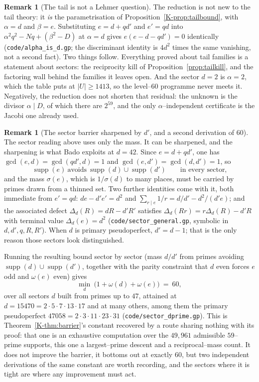 \documentclass[11pt]{article}
\theoremstyle{definition}
\newtheorem{remark}[theorem]{Remark}
\begin{document}
\begin{remark}[The tail is not a Lehmer question]
The reduction is not new to the tail theory: it \emph{is} the parametrisation of
Proposition~\ref{K-prop:tailbound}, with $\alpha=d$ and $\beta=e$. Substituting $e=d+qd'$ and $e'=qd$
into $\alpha^2q^2-Nq+(\beta^2-D)$ at $\alpha=d$ gives $e(e-d-qd')=0$ identically
\textup{(\texttt{code/alpha\_is\_d.gp}; the discriminant identity is $4d^2$ times the same
vanishing, not a second fact)}. Two things follow. Everything proved about tail families is
a statement about sectors: the reciprocity kill of Proposition~\ref{prop:tailkill}, and the
factoring wall behind the families it leaves open. And the sector $d=2$ is $\alpha=2$, which the
table puts at $|U|\ge1413$, so the level--$60$ programme never meets it. Negatively, the reduction
does not shorten that residual: the unknown is the divisor $\alpha\mid D$, of which there are
$2^{59}$, and the only $\alpha$--independent certificate is the Jacobi one already used.


\begin{remark}[The sector barrier sharpened by $d'$, and a second derivation of $60$]\label{rem:sectordprime}
The sector reading above uses only the mass. It can be sharpened, and the sharpening is what
Bado \cite{Bado2026b} exploits at $d=42$. Since $e=d+qd'$, one has $\gcd(e,d)=\gcd(qd',d)=1$ and
$\gcd(e,d')=\gcd(d,d')=1$, so
\[ \operatorname{supp}(e)\ \text{avoids}\ \operatorname{supp}(d)\cup\operatorname{supp}(d')
   \qquad\text{in every sector,} \]
and the mass $\sigma(e)$, which is $1/\sigma(d)$ to many places, must be carried by primes drawn
from a thinned set. Two further identities come with it, both immediate from $e'=qd$:
$de-d'e'=d^2$ and $\sum_{r\mid e}1/r=d/d'-d^2/(d'e)$; and the associated defect
$\Delta_d(R)=dR-d'R'$ satisfies $\Delta_d(Rr)=r\Delta_d(R)-d'R$ with terminal value
$\Delta_d(e)=d^2$ \textup{(\texttt{code/sector\_general.gp}, symbolic in $d,d',q,R,R'$)}. When $d$
is primary pseudoperfect, $d'=d-1$; that is the only reason those sectors look distinguished.

Running the resulting bound sector by sector (mass $d/d'$ from primes avoiding
$\operatorname{supp}(d)\cup\operatorname{supp}(d')$, together with the parity constraint that $d$
even forces $e$ odd and $\omega(e)$ even) gives
\[ \min_{d}\ \bigl(1+\omega(d)+\omega(e)\bigr)\ =\ 60, \]
over all sectors $d$ built from primes up to $47$, attained at $d=15470=2\cdot5\cdot7\cdot13\cdot17$
and at many others, among them the primary pseudoperfect $47058=2\cdot3\cdot11\cdot23\cdot31$
\textup{(\texttt{code/sector\_dprime.gp})}. This is Theorem~\ref{K-thm:barrier}'s constant recovered
by a route sharing nothing with its proof: that one is an exhaustive computation over the $49{,}961$
admissible $59$--prime supports, this one a largest--prime descent and a reciprocal--mass count. It
does not improve the barrier, it bottoms out at exactly $60$, but two independent derivations
of the same constant are worth recording, and the sectors where it is tight are where any
improvement must act.


\end{remark}
\end{remark}
\end{document}
